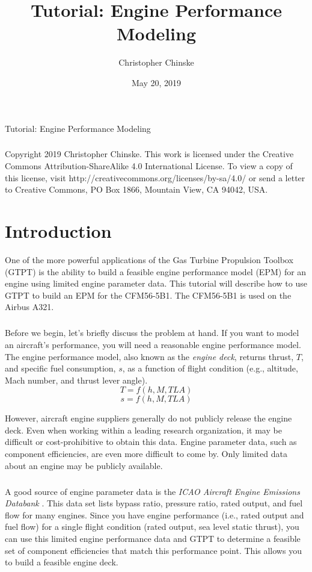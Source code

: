 \documentclass[12pt,twoside]{article}
\title{Tutorial: Engine Performance Modeling}
\author{Christopher Chinske}
\date{May 20, 2019}
\begin{document}
\maketitle

\newpage
\subparagraph{}
\begin{flushleft}
  Tutorial: Engine Performance Modeling
\end{flushleft}
\subparagraph{}
\begin{flushleft}
  Copyright 2019 Christopher Chinske.  This work is licensed under the Creative Commons Attribution-ShareAlike 4.0 International License. To view a copy of this license, visit http://creativecommons.org/licenses/by-sa/4.0/ or send a letter to Creative Commons, PO Box 1866, Mountain View, CA 94042, USA.
\end{flushleft}
\newpage

\section{Introduction}
One of the more powerful applications of the Gas Turbine Propulsion
Toolbox (GTPT) is the ability to build a feasible engine performance
model (EPM) for an engine using limited engine parameter data.  This
tutorial will describe how to use GTPT to build an EPM for the
CFM56-5B1.  The CFM56-5B1 is used on the Airbus A321.

\subparagraph{}
Before we begin, let's briefly discuss the problem at hand.  If you
want to model an aircraft's performance, you will need a reasonable
engine performance model.  The engine performance model, also known as
the \emph{engine deck}, returns thrust, $T$, and specific fuel
consumption, $s$, as a function of flight condition (e.g., altitude,
Mach number, and thrust lever angle).
\begin{equation}
  T = f(h,M,TLA)
\end{equation}
\begin{equation}
  s = f(h,M,TLA)
\end{equation}

However, aircraft engine suppliers generally do not publicly release
the engine deck.  Even when working within a leading research
organization, it may be difficult or cost-prohibitive to obtain this
data.  Engine parameter data, such as component efficiencies, are even
more difficult to come by.  Only limited data about an engine may be
publicly available.

\subparagraph{}
A good source of engine parameter data is the \emph{ICAO Aircraft
  Engine Emissions Databank} \cite{icaoed}.  This data set lists
bypass ratio, pressure ratio, rated output, and fuel flow for many
engines.  Since you have engine performance (i.e., rated output and
fuel flow) for a single flight condition (rated output, sea level
static thrust), you can use this limited engine performance data and
GTPT to determine a feasible set of component efficiencies that match
this performance point.  This allows you to build a feasible engine
deck.
\end{document}
